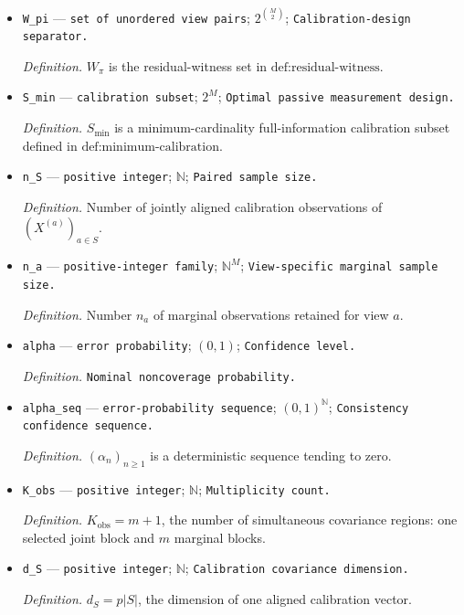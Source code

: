 \documentclass{article}
\begin{document}
\begin{itemize}
  \item \texttt{W\_\allowbreak{}pi} --- \texttt{set of unordered view pairs}; \(2^{\binom M2}\); \texttt{Calibration-\allowbreak{}design separator.}
  \par\smallskip\noindent\emph{Definition.} \(W_\pi\) is the residual-witness set in \(\text{def:residual-witness}\).
  \item \texttt{S\_\allowbreak{}min} --- \texttt{calibration subset}; \(2^M\); \texttt{Optimal passive measurement design.}
  \par\smallskip\noindent\emph{Definition.} \(S_{\min}\) is a minimum-cardinality full-information calibration subset defined in \(\text{def:minimum-calibration}\).
  \item \texttt{n\_\allowbreak{}S} --- \texttt{positive integer}; \(\mathbb N\); \texttt{Paired sample size.}
  \par\smallskip\noindent\emph{Definition.} Number of jointly aligned calibration observations of \((X^{(a)})_{a\in S}\).
  \item \texttt{n\_\allowbreak{}a} --- \texttt{positive-\allowbreak{}integer family}; \(\mathbb N^M\); \texttt{View-\allowbreak{}specific marginal sample size.}
  \par\smallskip\noindent\emph{Definition.} Number \(n_a\) of marginal observations retained for view \(a\).
  \item \texttt{alpha} --- \texttt{error probability}; \((0,1)\); \texttt{Confidence level.}
  \par\smallskip\noindent\emph{Definition.} \texttt{Nominal noncoverage probability.}
  \item \texttt{alpha\_\allowbreak{}seq} --- \texttt{error-\allowbreak{}probability sequence}; \((0,1)^{\mathbb N}\); \texttt{Consistency confidence sequence.}
  \par\smallskip\noindent\emph{Definition.} \((\alpha_n)_{n\ge1}\) is a deterministic sequence tending to zero.
  \item \texttt{K\_\allowbreak{}obs} --- \texttt{positive integer}; \(\mathbb N\); \texttt{Multiplicity count.}
  \par\smallskip\noindent\emph{Definition.} \(K_{\mathrm{obs}}=m+1\), the number of simultaneous covariance regions: one selected joint block and \(m\) marginal blocks.
  \item \texttt{d\_\allowbreak{}S} --- \texttt{positive integer}; \(\mathbb N\); \texttt{Calibration covariance dimension.}
  \par\smallskip\noindent\emph{Definition.} \(d_S=p\lvert S\rvert\), the dimension of one aligned calibration vector.

\end{itemize}
\end{document}
